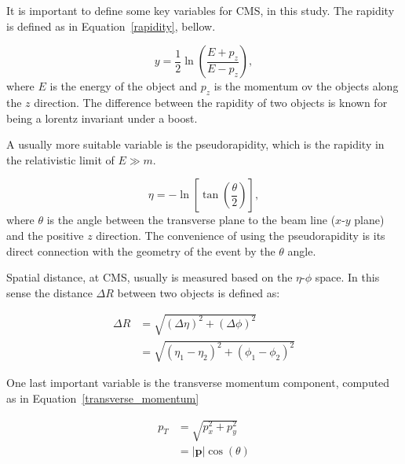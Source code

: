 It is important to define some key variables for CMS, in this study. The rapidity is defined as in Equation~\ref{rapidity}, bellow.

\begin{equation}
    y=\frac{1}{2} \ln \left( \frac{E+p_z}{E-p_z} \right),
    \label{rapidity}
\end{equation}
where $E$ is the energy of the object and $p_z$ is the momentum ov the objects along the $z$ direction. The difference between the rapidity of two objects is known for being a lorentz invariant under a boost.

A usually more suitable variable is the pseudorapidity, which is the rapidity in the relativistic limit of $E \gg m$.

\begin{equation}
    \eta = - \ln \left [ \tan \left( \frac{\theta}{2} \right)\right],
    \label{pseudorapidity}
\end{equation}
where $\theta$ is the angle between the transverse plane to the beam line ($x$-$y$ plane) and the positive $z$ direction. The convenience of using the pseudorapidity is its direct connection with the geometry of the event by the $\theta$ angle.

Spatial distance, at CMS, usually is measured based on the $\eta$-$\phi$ space. In this sense the distance $\Delta R$ between two objects is defined as:

\begin{equation}
    \begin{split}
        \Delta R &= \sqrt{(\Delta \eta)^2+(\Delta \phi)^2} \\
        & =\sqrt{(\eta_1 - \eta_2)^2+(\phi_1 - \phi_2)^2}
    \end{split}
    \label{delta_R}
\end{equation}

One last important variable is the transverse momentum component, computed as in Equation~\ref{transverse_momentum}

\begin{equation}
    \begin{split}
        p_T &= \sqrt{p_x^2 + p_y^2} \\
        & =|\mathbf{p}| \cos(\theta)
    \end{split}
    \label{transverse_momentum}
\end{equation}